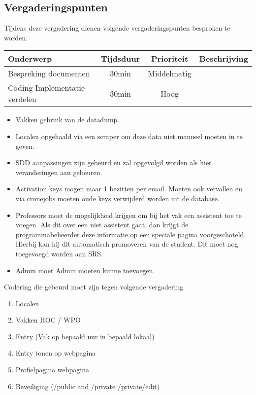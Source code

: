 \subsection{Vergaderingspunten}
Tijdens deze vergadering dienen volgende vergaderingspunten besproken te worden.
\begin{table} [H]
	\centering
	\begin{tabular} {l|c|c|c}
		Onderwerp & Tijdsduur & Prioriteit & Beschrijving \\ %
		\hline
		Bespreking documenten & 30min & Middelmatig &  \\
		Coding Implementatie verdelen & 30min & Hoog & \\
	\end{tabular}
	
	\begin{itemize}
		\item Vakken gebruik van de datadump.
		\item Localen opgehaald via een scraper om deze data niet manueel moeten in te geven.
		\item SDD aanpassingen zijn gebeurd en zal opgevolgd worden als hier veranderingen aan gebeuren.
		\item Activation keys mogen maar 1 bezitten per email. Moeten ook vervallen en via cronejobs moeten oude keys verwijderd worden uit de database.
		\item Professors moet de mogelijkheid krijgen om bij het vak een assistent toe te voegen. Als dit over een niet assistent gaat, dan krijgt de programmabeheerder deze informatie op een speciale pagina voorgeschoteld. Hierbij kan hij dit automatisch promoveren van de student. Dit moet nog toegevoegd worden aan SRS.
		\item Admin moet Admin moeten kunne toevoegen.
	\end{itemize}
\end{table}

Codering die gebeurd moet zijn tegen volgende vergadering
\begin{enumerate}
	\item Localen
	\item Vakken HOC / WPO
	\item Entry (Vak op bepaald uur in bepaald lokaal)
	\item Entry tonen op webpagina
	\item Profielpagina webpagina
	\item Beveiliging (/public and /private /private/edit)
\end{enumerate}

